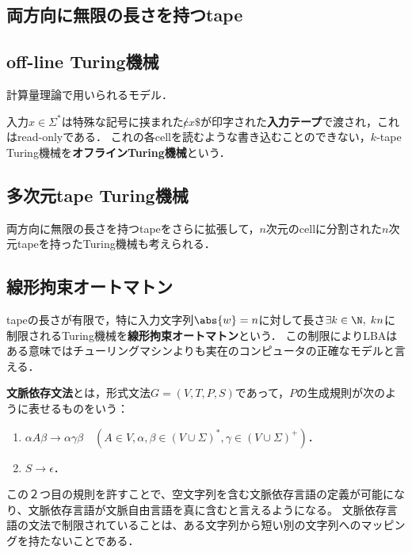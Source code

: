 \subsection{両方向に無限の長さを持つtape}

\subsection{off-line Turing機械}

計算量理論で用いられるモデル．

\begin{definition}
    入力$x\in\Sigma^*$は特殊な記号に挟まれた$\not cx\$$が印字された\textbf{入力テープ}で渡され，これはread-onlyである．
    これの各cellを読むような書き込むことのできない，$k$-tape Turing機械を\textbf{オフラインTuring機械}という．
\end{definition}

\subsection{多次元tape Turing機械}

両方向に無限の長さを持つtapeをさらに拡張して，$n$次元のcellに分割された$n$次元tapeを持ったTuring機械も考えられる．

\subsection{線形拘束オートマトン}

\begin{definition}
    tapeの長さが有限で，特に入力文字列$\abs{w}=n$に対して長さ$\exists k\in\N,\;kn$に制限されるTuring機械を\textbf{線形拘束オートマトン}という．
    この制限によりLBAはある意味ではチューリングマシンよりも実在のコンピュータの正確なモデルと言える．
\end{definition}

\begin{definition}
    \textbf{文脈依存文法}とは，形式文法$G=(V,T,P,S)$であって，$P$の生成規則が次のように表せるものをいう：
    \begin{enumerate}
        \item $\alpha A\beta\to\alpha\gamma\beta\quad(A\in V,\alpha,\beta\in(V\cup\Sigma)^*,\gamma\in(V\cup\Sigma)^+)$．
        \item $S\to\epsilon$．
    \end{enumerate}
\end{definition}
\begin{remark}
    この２つ目の規則を許すことで、空文字列を含む文脈依存言語の定義が可能になり、文脈依存言語が文脈自由言語を真に含むと言えるようになる。
    文脈依存言語の文法で制限されていることは、ある文字列から短い別の文字列へのマッピングを持たないことである．
\end{remark}

